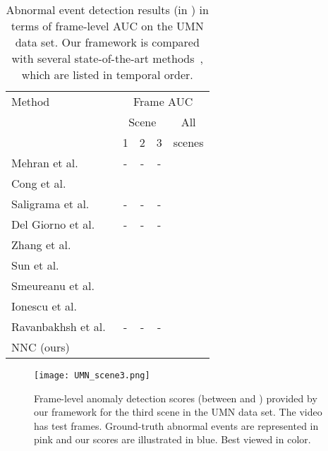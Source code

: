 \documentclass[10pt,twocolumn,letterpaper]{article}
\begin{document}
\begin{table}[t]
\small{
\begin{center}
\begin{tabular}{|l|c|c|c|c|}
\hline
Method 																& \multicolumn{4}{|c|}{Frame AUC} \\
\cline{2-5}
			 																& \multicolumn{3}{|c|}{Scene} 							& All \\
\cline{2-4}
			 																& 1   					& 2 					& 3 					& scenes \\
\hline
\hline
Mehran et al.~\cite{Mehran-CVPR-2009}				& -					& - 					& -					&  \\
Cong et al.~\cite{Cong-CVPR-2011}						& 			&  			& 			&  \\
Saligrama et al.~\cite{Saligrama-CVPR-2012}		& -					& -	 				& -					&  \\
Del Giorno et al.~\cite{Giorno-ECCV-2016}			& -					& -					& - 					&  \\
Zhang et al.~\cite{Zhang-PR-2016}						& 			&  			& 			&  \\
Sun et al.~\cite{Sun-PR-2017}								& 			&  			& 			&  \\
Smeureanu et al.~\cite{Smeureanu-ICIAP-2017}	& 			&  			& 			&  \\
Ionescu et al.~\cite{Ionescu-ICCV-2017}				& 			&  			& 			& 	 \\
Ravanbakhsh et al.~\cite{Ravanbakhsh-ICIP-2017}	& -				& -					& - 					&  \\
\hline
NNC (ours)	 														& 			&  		&  				&  \\
\hline
\end{tabular}
\end{center}
\vspace*{-0.1cm}
\caption{Abnormal event detection results (in ) in terms of frame-level AUC on the UMN data set. Our framework is compared with several state-of-the-art methods~\cite{Cong-CVPR-2011,Giorno-ECCV-2016,Ionescu-ICCV-2017,Mehran-CVPR-2009,Ravanbakhsh-ICIP-2017,Saligrama-CVPR-2012,Smeureanu-ICIAP-2017,Sun-PR-2017,Zhang-PR-2016}, which are listed in temporal order.\label{tab_UMN}}
}
\vspace*{-0.1cm}
\end{table}

\begin{figure}[!t]
\begin{center}
\texttt{[image: UMN\_scene3.png]}
\end{center}
\vspace*{-0.3cm}
\caption{Frame-level anomaly detection scores (between  and ) provided by our framework for the third scene in the UMN data set. The video has  test frames. Ground-truth abnormal events are represented in pink and our scores are illustrated in blue. Best viewed in color.}
\label{fig_UMN_scene3}
\vspace*{-0.4cm}
\end{figure}
\end{document}
